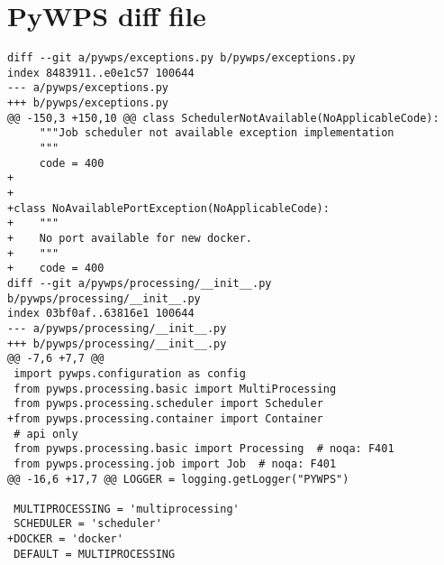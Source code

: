 \newpage
\section{PyWPS diff file}
\begin{lstlisting}[basicstyle=\small,caption={pywps diff file}]
diff --git a/pywps/exceptions.py b/pywps/exceptions.py
index 8483911..e0e1c57 100644
--- a/pywps/exceptions.py
+++ b/pywps/exceptions.py
@@ -150,3 +150,10 @@ class SchedulerNotAvailable(NoApplicableCode):
     """Job scheduler not available exception implementation
     """
     code = 400
+
+
+class NoAvailablePortException(NoApplicableCode):
+    """
+    No port available for new docker.
+    """
+    code = 400
diff --git a/pywps/processing/__init__.py b/pywps/processing/__init__.py
index 03bf0af..63816e1 100644
--- a/pywps/processing/__init__.py
+++ b/pywps/processing/__init__.py
@@ -7,6 +7,7 @@
 import pywps.configuration as config
 from pywps.processing.basic import MultiProcessing
 from pywps.processing.scheduler import Scheduler
+from pywps.processing.container import Container
 # api only
 from pywps.processing.basic import Processing  # noqa: F401
 from pywps.processing.job import Job  # noqa: F401
@@ -16,6 +17,7 @@ LOGGER = logging.getLogger("PYWPS")
 
 MULTIPROCESSING = 'multiprocessing'
 SCHEDULER = 'scheduler'
+DOCKER = 'docker'
 DEFAULT = MULTIPROCESSING
 

\end{lstlisting}
